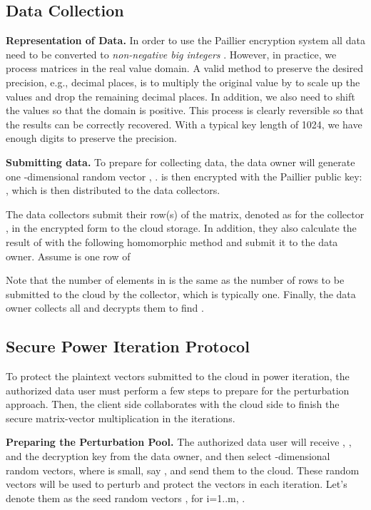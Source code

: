 \documentclass[10pt, conference, compsocconf]{IEEEtran}
\begin{document}
\subsection{Data Collection}\label{sec:data}
\textbf{Representation of Data.} In order to use the Paillier encryption system all data need to be converted to \emph{non-negative big integers} \cite{paillier99}. However, in practice, we process matrices in the real value domain. A valid method to preserve the desired precision, e.g.,  decimal places, is to multiply the original value by  to scale up the values and drop the remaining decimal places. In addition, we also need to shift the values so that the domain is positive. This process is clearly reversible so that the results can be correctly recovered. With a typical key length of 1024, we have enough digits to preserve the precision. 





\textbf{Submitting data.} To prepare for collecting data, the data owner will generate one -dimensional random vector , .  is then encrypted with the Paillier public key:\\ , which is then distributed to the data collectors. 

The data collectors submit their row(s) of the matrix, denoted as  for the collector , in the encrypted form to the cloud storage. In addition, they also calculate the result of  with the following homomorphic method and submit it to the data owner. Assume  is one row of 

Note that the number of elements in  is the same as the number of rows to be submitted to the cloud by the collector, which is typically one. Finally, the data owner collects all  and decrypts them to find .


\subsection{Secure Power Iteration Protocol}


To protect the plaintext vectors submitted to the cloud in power iteration, the authorized data user must perform a few steps to prepare for the perturbation approach. Then, the client side collaborates with the cloud side to finish the secure matrix-vector multiplication in the iterations. 

\textbf{Preparing the Perturbation Pool.} The authorized data user will receive , , and the decryption key from the data owner, and then select  -dimensional random vectors, where  is small, say , and send them to the cloud. These random vectors will be used to perturb and protect the vectors  in each iteration. Let's denote them as the seed random vectors , for i=1..m, . 
\end{document}
